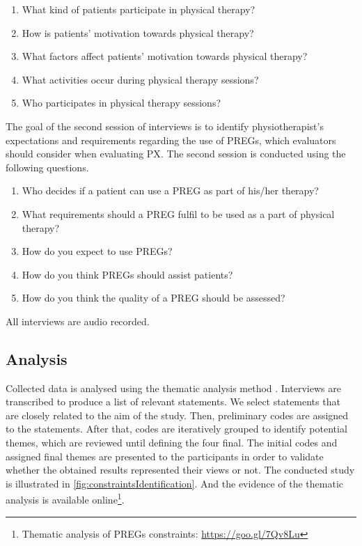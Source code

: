\begin{enumerate}
    \item What kind of patients participate in physical therapy?
    \item How is patients' motivation towards physical therapy?
    \item What factors affect patients' motivation towards physical therapy?
    \item What activities occur during physical therapy sessions?
    \item Who participates in physical therapy sessions?
\end{enumerate}

The goal of the second session of interviews is to identify physiotherapist's expectations and requirements regarding the use of \acp{PREG}, which evaluators should consider when evaluating \ac{PX}. The second session is conducted using the following questions.
\begin{enumerate}
    \item Who decides if a patient can use a \ac{PREG} as part of his/her therapy?
    \item What requirements should a \ac{PREG} fulfil to be used as a part of physical therapy?
    \item How do you expect to use \acp{PREG}?
    \item How do you think \acp{PREG} should assist patients?
    \item How do you think the quality of a \ac{PREG} should be assessed?
\end{enumerate}

All interviews are audio recorded.

\subsection{Analysis}

Collected data is analysed using the thematic analysis method \autocite{Burnard2008}. Interviews are transcribed to produce a list of relevant statements. We select statements that are closely related to the aim of the study. Then, preliminary codes are assigned to the statements. After that, codes are iteratively grouped to identify potential themes, which are reviewed until defining the four final. The initial codes and assigned final themes are presented to the participants in order to validate whether the obtained results represented their views or not. The conducted study is illustrated in \autoref{fig:constraintsIdentification}. And the evidence of the thematic analysis is available online\footnote{Thematic analysis of \acp{PREG} constraints: \url{https://goo.gl/7Qv8Lu}}.

